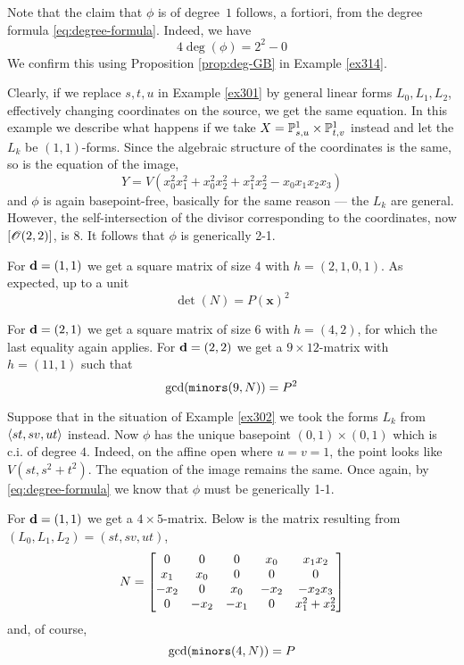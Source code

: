 \documentclass[fleqn,reqno]{amsart}
\numberwithin{first}{chapter}
\begin{document}
\begin{example}[$\mt{ex301}$]
Note that the claim that $\phi$ is of degree~$1$ follows, a fortiori, from the degree formula
\eqref{eq:degree-formula}. Indeed, we have
\[
	4\deg(\phi)=2^2-0
\]
We confirm this using Proposition \ref{prop:deg-GB} in Example \ref{ex314}.
\end{example}

\begin{example}[$\mt{ex302}$]
\label{ex302}
Clearly, if we replace $s,t,u$ in Example \ref{ex301} by general linear forms $L_0,L_1,L_2$,
effectively changing coordinates on the source, we get the same equation.
In this example we describe what happens if we take $X=\mathbb{P}^1_{s,u}\times\mathbb{P}^1_{t,v}$ instead
and let the $L_k$ be $(1,1)$-forms.
Since the algebraic structure of the coordinates is the same, so is the equation of the image,
\[
	Y=V({x}_{0}^{2} {x}_{1}^{2}+{x}_{0}^{2} {x}_{2}^{2}+{x}_{1}^{2}
	{x}_{2}^{2}-{x}_{0} {x}_{1} {x}_{2} {x}_{3})
\]
and $\phi$ is again basepoint-free, basically for the same reason ---
the $L_k$ are general.
However, the self-intersection of the divisor corresponding to the coordinates,
now $[\mathscr{O}(2,2)]$, is $8$.
It follows that $\phi$ is generically 2-1.

For $\mathbf d=(1,1)$ we get a square matrix of size $4$ with $h=(2,1,0,1)$.
As expected, up to a unit
\[
	\det(N)=P(\mathbf x)^2
\]

For $\mathbf d=(2,1)$ we get a square matrix of size $6$ with $h=(4,2)$, for which the
last equality again applies.
For $\mathbf d=(2,2)$ we get a $9\times12$-matrix with $h=(11,1)$ such that
\[
	\gcd(\mathop{\tt minors}(9,N))=P^2
\]
\end{example}

\begin{example}[$\mt{ex303}$]
\label{ex303}
Suppose that in the situation of Example \ref{ex302} we took the forms $L_k$ from
$\langle st,sv,ut\rangle$ instead.
Now $\phi$ has the unique basepoint $(0,1)\times(0,1)$ which is c.i. of degree $4$.
Indeed, on the affine open where $u=v=1$, the point looks like $V(st,s^2+t^2)$.
The equation of the image remains the same.
Once again, by \eqref{eq:degree-formula} we know that $\phi$ must be generically 1-1.

For $\mathbf d=(1,1)$ we get a $4\times5$-matrix.
Below is the matrix resulting from $(L_0,L_1,L_2)=(st,sv,ut)$,
\[
	N=
	\bgroup\begin{bmatrix}0&
      0&
      0&
      {x}_{0}&
      {x}_{1} {x}_{2}\\
      {x}_{1}&
      {x}_{0}&
      0&
      0&
      0\\
      {-{x}_{2}}&
      0&
      {x}_{0}&
      {-{x}_{2}}&
      {-{x}_{2} {x}_{3}}\\
      0&
      {-{x}_{2}}&
      {-{x}_{1}}&
      0&
      {x}_{1}^{2}+{x}_{2}^{2}\\
      \end{bmatrix}\egroup
\]
and, of course,
\[
	\gcd(\mathop{\tt minors}(4,N))=P
\]
\end{example}
\end{document}
